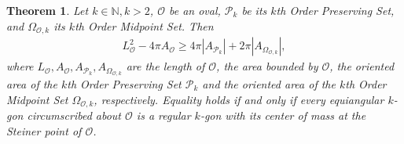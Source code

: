 \documentclass{amsart}
\newtheorem{thm}{Theorem}[section]
\theoremstyle{definition}
\numberwithin{equation}{section}
\begin{document}
\begin{thm}\label{ThmIsoEq2}
Let $k\in \mathbb{N}, k>2$, $\mathcal{O}$ be an oval, $\mathcal{P}_k$ be its $k$th Order Preserving Set, and $\Omega_{\mathcal{O},k}$ its $k$th Order Midpoint Set. Then
\begin{align}\label{IsoEq2}
L_{\mathcal{O}}^2 - 4\pi A_{\mathcal{O}} \geqslant 4\pi |A_{\mathcal{P}_k}| + 2\pi |A_{\Omega_{\mathcal{O},k}}|,
\end{align}
where $L_{\mathcal{O}}, A_{\mathcal{O}}, A_{\mathcal{P}_k},A_{\Omega_{\mathcal{O},k}}$ are the length of $\mathcal{O}$, the area bounded by $\mathcal{O}$, the oriented area of the $k$th Order Preserving Set $\mathcal{P}_k$ and the oriented area of the $k$th Order Midpoint Set $\Omega_{\mathcal{O},k}$, respectively. Equality holds if and only if every equiangular \linebreak $k$-gon circumscribed about $\mathcal{O}$ is a regular $k$-gon with its center of mass at the Steiner point of $\mathcal{O}$.
\end{thm}
\end{document}
